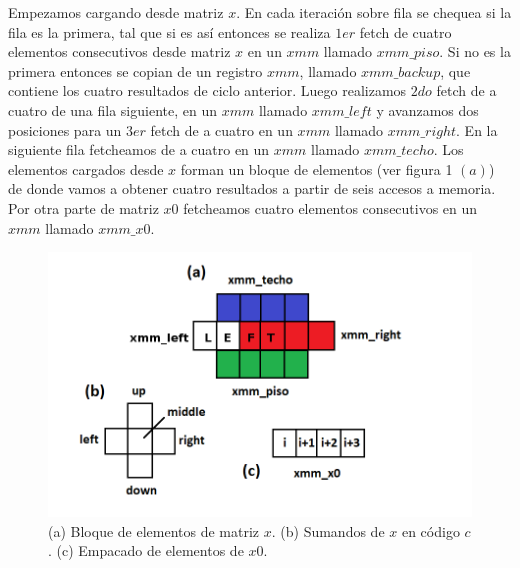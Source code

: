 \par Empezamos cargando desde matriz $x$. En cada iteración sobre fila se chequea si la fila es la primera, tal que si es así entonces 
 se realiza $1er$ fetch de cuatro elementos consecutivos desde matriz $x$ en un $xmm$ llamado $xmm\_piso$. Si no es la primera entonces se copian de un registro $xmm$, llamado $xmm\_backup$, que contiene los cuatro resultados de ciclo anterior. Luego realizamos $2do$ fetch de a cuatro de una fila siguiente, en un $xmm$ llamado $xmm\_left$ y avanzamos dos posiciones para un $3er$ fetch de a cuatro en un $xmm$ llamado $xmm\_right$. En la siguiente fila fetcheamos de a cuatro en un $xmm$ llamado $xmm\_techo$. Los elementos cargados desde $x$ forman un bloque de elementos (ver figura 1 $(a)$) de donde vamos a obtener cuatro resultados a partir de seis accesos a memoria. Por otra parte de matriz $x0$ fetcheamos cuatro elementos consecutivos en un $xmm$ llamado $xmm\_x0$.\newline

\begin{figure}[h]
\centering
\includegraphics[scale=0.6] {celdas_xmm}
\caption{(a) Bloque de elementos de matriz $x$. (b) Sumandos de $x$ en código $c$. (c) Empacado de elementos de $x0$.}
\end{figure} 

